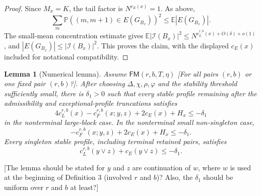 \documentclass[11pt]{article}
\newtheorem{lem}{Lemma}
\newcommand{\cI}{\mathcal I}
\newcommand{\E}{\mathbb E}
\newcommand{\Pbb}{\mathbb P}
\newcommand{\jscomment}[1]{\textup{\textsf{\color{blue}[#1]}}}
\begin{document}
\begin{proof}
Since \(M_x=K\), the tail factor is \(N^{c_E(x)}=1\). As above,
\[
    \sum_m\Pbb((m,m+1)\in E(G_{B_x}))^2
    \le \E |E(G_{B_x})| .
\]
The small-mean concentration estimate gives
\(\E|\cI(B_x)|^2\le N^{c_L^{r,b}(x)+O(\delta)+o(1)}\), and
\(|E(G_{B_x})|\le |\cI(B_x)|^2\). This proves the claim, with the
displayed \(c_E(x)\) included for notational compatibility.
\end{proof}

\begin{lem}[Numerical lemma]
Assume \(\mathsf{FM}(r,b,T,\eta)\) \jscomment{For all pairs $(r,b)$ or one fixed pair $(r,b)$?}. After choosing
\(\Delta,\chi,\rho,\varphi\) and the stability threshold sufficiently
small, there is \(\delta_1>0\) such that every stable profile remaining
after the admissibility and exceptional-profile truncations satisfies
\[
    4c_L^{r,b}(x)-c_F^{r,b}(x;y,z)+2c_E(x)+H_x\le-\delta_1
\]
in the nonterminal large-block case. In the nonterminal small
non-singleton case,
\[
    -c_F^{r,b}(x;y,z)+2c_E(x)+H_x\le-\delta_1.
\]
Every singleton stable profile, including terminal retained pairs,
satisfies
\[
    c_L^{r,b}(y\vee z)+c_E(y\vee z)\le-\delta_1.
\]
\end{lem}

\jscomment{The lemma should be stated for $y$ and $z$ are continuation of $w$, where $w$ is used at the beginning of Definition 3 (involved $r$ and $b$)? Also, the $\delta_1$ should be uniform over $r$ and $b$ at least?}
\end{document}

